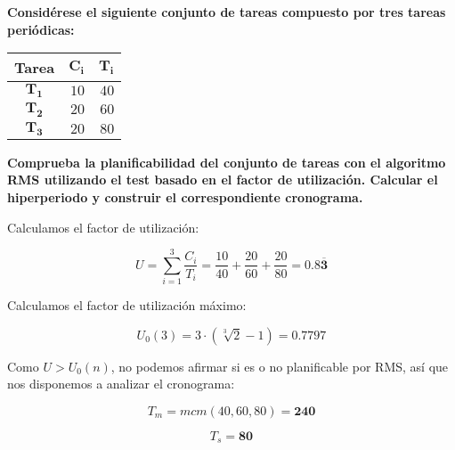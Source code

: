 \textbf{Considérese el siguiente conjunto de tareas compuesto por tres tareas periódicas:}

\begin{center}
	\begin{tabular}{|c|rr|}
		\hline
		\textbf{Tarea} & $\boldsymbol{C_i}$ & $\boldsymbol{T_i}$ \\
		\hline
		\hline
		$\boldsymbol{T_1}$ & $10$ & $40$ \\
		$\boldsymbol{T_2}$ & $20$ & $60$ \\
		$\boldsymbol{T_3}$ & $20$ & $80$ \\
		\hline
	\end{tabular}
\end{center}

\textbf{Comprueba la planificabilidad del conjunto de tareas con el algoritmo RMS utilizando el test basado en el factor de utilización.
Calcular el hiperperiodo y construir el correspondiente cronograma.}

Calculamos el factor de utilización:

\[U=\sum_{i=1}^{3}\frac{C_i}{T_i}=\frac{10}{40}+\frac{20}{60}+\frac{20}{80}=\boldsymbol{0.8\overline{3}}\]

Calculamos el factor de utilización máximo:

\[U_0(3)=3\cdot(\sqrt[3]{2}-1)=\boldsymbol{0.7797}\]

\pagebreak

Como $U>U_0(n)$, no podemos afirmar si es o no planificable por RMS, así que nos disponemos a analizar el cronograma:

\[T_m=mcm(40,60,80)=\boldsymbol{240}\]

\[T_s=\boldsymbol{80}\]

